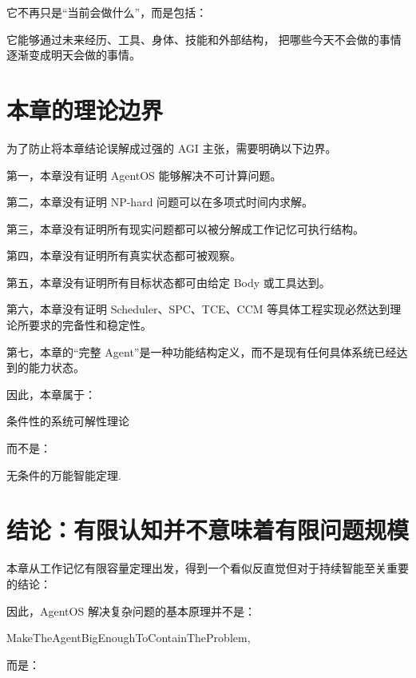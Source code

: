 它不再只是“当前会做什么”，而是包括：

\begin{statementbox}
它能够通过未来经历、工具、身体、技能和外部结构，
把哪些今天不会做的事情逐渐变成明天会做的事情。
\end{statementbox}

\section{本章的理论边界}

为了防止将本章结论误解成过强的 AGI 主张，需要明确以下边界。

第一，本章没有证明 AgentOS 能够解决不可计算问题。

第二，本章没有证明 NP-hard 问题可以在多项式时间内求解。

第三，本章没有证明所有现实问题都可以被分解成工作记忆可执行结构。

第四，本章没有证明所有真实状态都可被观察。

第五，本章没有证明所有目标状态都可由给定 Body 或工具达到。

第六，本章没有证明 Scheduler、SPC、TCE、CCM 等具体工程实现必然达到理论所要求的完备性和稳定性。

第七，本章的“完整 Agent”是一种功能结构定义，而不是现有任何具体系统已经达到的能力状态。

因此，本章属于：

\begin{statementbox}
条件性的系统可解性理论
\end{statementbox}
而不是：
\begin{statementbox}
无条件的万能智能定理.
\end{statementbox}

\section{结论：有限认知并不意味着有限问题规模}

本章从工作记忆有限容量定理出发，得到一个看似反直觉但对于持续智能至关重要的结论：

\begin{statementbox}
\centering
{}
\end{statementbox}

因此，AgentOS 解决复杂问题的基本原理并不是：

\begin{statementbox}
MakeTheAgentBigEnoughToContainTheProblem,
\end{statementbox}
而是：

